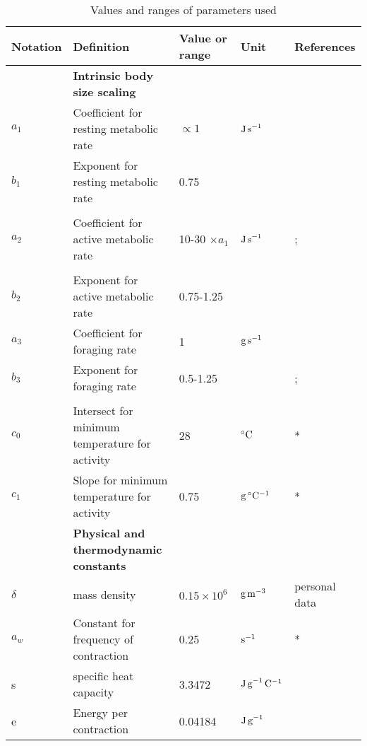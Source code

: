 
\begin{sidewaystable}
\caption{Values and ranges of parameters used }
\begin{tabular}{l l l l l}
\hline
Notation& Definition & Value or range & Unit & References \\
\hline
&\textbf{Intrinsic body size scaling} & & &  \\
$a_1$ & Coefficient for resting metabolic rate  & $\propto 1$  & $\rm{J \, s}^{-1}$ & \citet{Heinrich1975} \\
$b_1$ & Exponent for resting metabolic rate  & 0.75 &  & \citet{Kleiber1947,Peters1986} \\
      &                                      &      &  & \citet{Gillooly2001} \\
$a_2$ & Coefficient for active metabolic rate  & 10-30 $ \times a_1$ & $\rm{J \, s}^{-1}$ &  \citet{Bartholomew1981}; \\
      &                                        &                     &                    &  \citet{Niitepold2010} \\
$b_2$ & Exponent for active metabolic rate  & 0.75-1.25 & &  \citet{Heinrich1975} \\
$a_3$ & Coefficient for foraging rate  & 1 & $\rm{g \, s}^{-1}$  & \\
$b_3$ & Exponent  for foraging rate  & 0.5-1.25 &  &  \citet{Pawar2012, Nervo2014}; \\
      &                              &          &  &  \citet{Maino2015} \\
$c_0$ & Intersect for minimum temperature for activity & 28 & $^{\circ}\rm{C}$  & \citep{Bartholomew1977a}* \\
$c_1$ & Slope for minimum temperature for activity & 0.75 &  $\rm{g \,  ^{\circ}C^{-1}}$ &  \citep{Bartholomew1977a}* \\
& \textbf{Physical and thermodynamic constants} & & &  \\
$\delta $ & mass density & $0.15 \times 10^6$  & $\rm{g \, m}^{-3}$  & personal data\\
$a_w$& Constant for frequency of contraction & 0.25 & $\rm{s}^{-1}$   & \citet{Bartholomew1977b}*\\
s & specific heat capacity & 3.3472 & $\rm{J \, g}^{-1}\,\rm{C}^{-1}$ & \citet{Heinrich1975} \\
e & Energy per contraction & 0.04184 & $\rm{J \, g}^{-1}$ &\citet{Kammer1974} \\

\end{tabular}
\end{sidewaystable}
